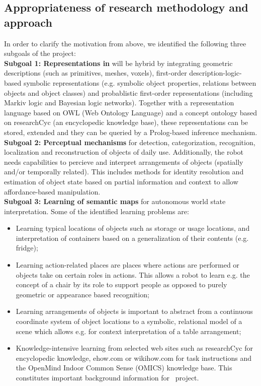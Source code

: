 \subsection{Appropriateness of research methodology and approach}
\label{sec:q2}
In order to clarify the motivation from above, we identified
the following three subgoals of the project: \\
\textbf{Subgoal 1: Representations in \ksem} will be hybrid by
  integrating geometric descriptions (such as primitives, meshes,
  voxels), first-order description-logic-based symbolic representations
  (e.g. symbolic object properties, relations between objects and object
  classes) and probablistic first-order representations (including
  Markiv logic and Bayesian logic networks).
  Together with a representation language based on OWL (Web Ontology
  Language) and a concept ontology based on researchCyc (an encyclopedic
  knowledge base), these representations can be stored, extended and
  they can be queried by a Prolog-based inference mechanism.\\
\textbf{Subgoal 2: Perceptual mechanisms} for detection,
  categorization, recognition, localization and reconstruction of
  objects of daily use. Additionally, the robot needs capabilities to
  percieve and interpret arrangements of objects (spatially and/or
  temporally related). This includes methods for identity resolution and
  estimation of object state based on partial information and context to
  allow affordance-based manipulation. \\
\textbf{Subgoal 3: Learning of semantic maps} for autonomous world state
  interpretation. Some of the identified learning problems are:
  \begin{itemize}
    \item Learning typical locations of objects such as storage or
      usage locations, and interpretation of containers based on a
      generalization of their contents (e.g. fridge);
    \item Learning action-related places are places where actions are
      performed or objects take on certain roles in actions. This allows
      a robot to learn e.g. the concept of a chair by its role to
      support people as opposed to purely geometric or appearance
      based recognition;
    \item Learning arrangements of objects is important to abstract from
      a continuous coordinate system of object locations to a symbolic,
      relational model of a scene which allows e.g. for context
      interpretation of a table arrangement;
    \item Knowledge-intensive learning from selected web sites such as
      researchCyc for encyclopedic knowledge, ehow.com or wikihow.com
      for task instructions and the OpenMind Indoor Common Sense (OMICS)
      knowledge base. This constitutes important background information
      for \ksem\ project.
  \end{itemize}
